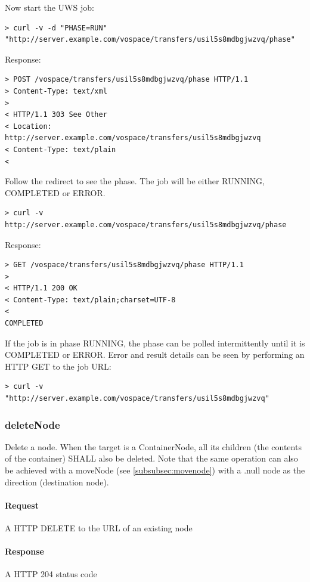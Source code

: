 \documentclass[11pt,a4paper]{ivoa}
\begin{document}
Now start the UWS job:
\begin{lstlisting}
> curl -v -d "PHASE=RUN" "http://server.example.com/vospace/transfers/usil5s8mdbgjwzvq/phase"
\end{lstlisting}
Response:
\begin{lstlisting}
> POST /vospace/transfers/usil5s8mdbgjwzvq/phase HTTP/1.1
> Content-Type: text/xml
>
< HTTP/1.1 303 See Other
< Location: http://server.example.com/vospace/transfers/usil5s8mdbgjwzvq
< Content-Type: text/plain
<
\end{lstlisting}
Follow the redirect to see the phase.  The job will be either RUNNING, COMPLETED or ERROR.
\begin{lstlisting}
> curl -v http://server.example.com/vospace/transfers/usil5s8mdbgjwzvq/phase
\end{lstlisting}
Response:
\begin{lstlisting}
> GET /vospace/transfers/usil5s8mdbgjwzvq/phase HTTP/1.1
>
< HTTP/1.1 200 OK
< Content-Type: text/plain;charset=UTF-8
<
COMPLETED
\end{lstlisting}
If the job is in phase RUNNING, the phase can be polled intermittently until it is COMPLETED or ERROR.
Error and result details can be seen by performing an HTTP GET to the job URL:
\begin{lstlisting}
> curl -v "http://server.example.com/vospace/transfers/usil5s8mdbgjwzvq"
\end{lstlisting}

\subsubsection{deleteNode}
\label{subsubsec:deletenode}
Delete a node.
When the target is a ContainerNode, all its children (the contents of the container) SHALL also be deleted.
Note that the same operation can also be achieved with a moveNode (see \ref{subsubsec:movenode}) with a .null node as the direction (destination node).

\paragraph{Request}
A HTTP DELETE to the URL of an existing node

\paragraph{Response}
A HTTP 204 status code
\end{document}
